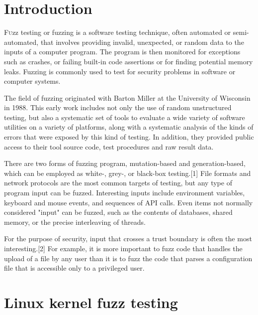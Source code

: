 \documentclass[twoside]{article}
\begin{document}
\begin{multicols}{2} %

\section{Introduction}

\lettrine[nindent=0em,lines=3]{F} uzz testing or fuzzing is a software testing technique, often automated or semi-automated, that involves providing invalid, unexpected, or random data to the inputs of a computer program. The program is then monitored for exceptions such as crashes, or failing built-in code assertions or for finding potential memory leaks. Fuzzing is commonly used to test for security problems in software or computer systems.

The field of fuzzing originated with Barton Miller at the University of Wisconsin in 1988. This early work includes not only the use of random unstructured testing, but also a systematic set of tools to evaluate a wide variety of software utilities on a variety of platforms, along with a systematic analysis of the kinds of errors that were exposed by this kind of testing. In addition, they provided public access to their tool source code, test procedures and raw result data.

There are two forms of fuzzing program, mutation-based and generation-based, which can be employed as white-, grey-, or black-box testing.[1] File formats and network protocols are the most common targets of testing, but any type of program input can be fuzzed. Interesting inputs include environment variables, keyboard and mouse events, and sequences of API calls. Even items not normally considered "input" can be fuzzed, such as the contents of databases, shared memory, or the precise interleaving of threads.

For the purpose of security, input that crosses a trust boundary is often the most interesting.[2] For example, it is more important to fuzz code that handles the upload of a file by any user than it is to fuzz the code that parses a configuration file that is accessible only to a privileged user.



\section{Linux kernel fuzz testing}


\end{multicols}
\end{document}
